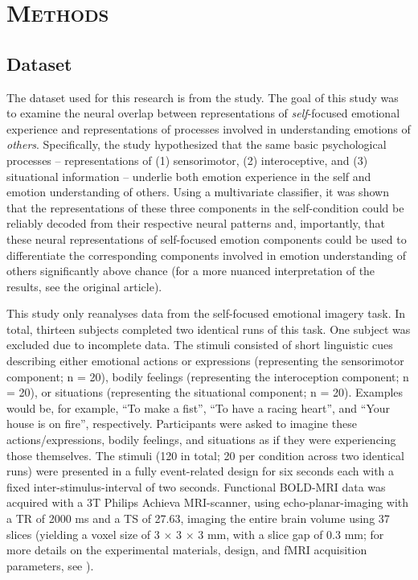 \documentclass[jou,12pt,a4paper]{apa6}
\begin{document}
\section{\Large \textsc{Methods}}

\subsection{Dataset}
\noindent The dataset used for this research is from the  study. The goal of this study was to examine the neural overlap between representations of \emph{self}-focused emotional experience and representations of processes involved in understanding emotions of \emph{others}. Specifically, the study hypothesized that the same basic psychological processes -- representations of (1) sensorimotor, (2) interoceptive, and (3) situational information -- underlie both emotion experience in the self and emotion understanding of others. Using a multivariate classifier, it was shown that the representations of these three components in the self-condition could be reliably decoded from their respective neural patterns and, importantly, that these neural representations of self-focused emotion components could be used to differentiate the corresponding components involved in emotion understanding of others significantly above chance (for a more nuanced interpretation of the results, see the original article).

This study only reanalyses data from the self-focused emotional imagery task. In total, thirteen subjects completed two identical runs of this task. One subject was excluded due to incomplete data. The stimuli consisted of short linguistic cues describing either emotional actions or expressions (representing the sensorimotor component; n = 20), bodily feelings (representing the interoception component; n = 20), or situations (representing the situational component; n = 20). Examples would be, for example, ``To make a fist'', ``To have a racing heart'', and ``Your house is on fire'', respectively. Participants were asked to imagine these actions/expressions, bodily feelings, and situations as if they were experiencing those themselves. The stimuli (120 in total; 20 per condition across two identical runs) were presented in a fully event-related design for six seconds each with a fixed inter-stimulus-interval of two seconds. Functional BOLD-MRI data was acquired with a 3T Philips Achieva MRI-scanner, using echo-planar-imaging with a TR of 2000 ms and a TS of 27.63, imaging the entire brain volume using 37 slices (yielding a voxel size of 3 $\times$ 3 $\times$ 3 mm, with a slice gap of 0.3 mm; for more details on the experimental materials, design, and fMRI acquisition parameters, see ).
\end{document}
